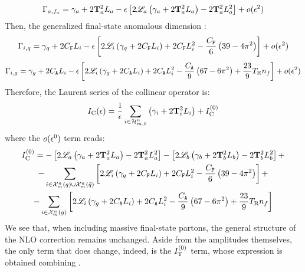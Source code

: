 \begin{equation}
  \Gamma_{a , f_a} = \gamma_a + 2 \mathbf{T}_a^2 L_a - \epsilon \left[ 2 \mathscr{L}_a \left( \gamma_a + 2 \mathbf{T}_a^2 L_a \right) - 2 \mathbf{T}_a^2 L_a^2 \right] + o(\epsilon^2)
\end{equation}
Then, the generalized final-state anomalous dimension :
\begin{equation}
  \Gamma_{i , q} = \gamma_q + 2 C_\mathtt{F} L_i - \epsilon \left[ 2 \mathscr{L}_i \left( \gamma_q + 2 C_\mathtt{F} L_i \right) + 2 C_\mathtt{F} L_i^2 - \frac{C_\mathtt{F}}{6} \left( 39 - 4\pi^2 \right) \right] + o(\epsilon^2)
\end{equation}
\begin{equation}
  \Gamma_{i , g} = \gamma_g + 2 C_\mathtt{A} L_i - \epsilon \left[ 2 \mathscr{L}_i \left( \gamma_g + 2 C_\mathtt{A} L_i \right) + 2 C_\mathtt{A} L_i^2 - \frac{C_\mathtt{A}}{9} \left( 67 - 6\pi^2 \right) + \frac{23}{9} T_\text{R} n_f \right] + o(\epsilon^2)
\end{equation}
Therefore, the Laurent series of the collinear operator is:
\begin{equation}
  I_\text{C}(\epsilon) = \frac{1}{\epsilon} \sum_{i \in \mathcal{H}^{n}_{m,0}} \left( \gamma_i + 2 \mathbf{T}_i^2 L_i \right) + I_\text{C}^{(0)}
\end{equation}
where the $ o(\epsilon^0) $ term reads:
\begin{multline}
  I_\text{C}^{(0)} = - \left[ 2 \mathscr{L}_a \left( \gamma_a + 2 \mathbf{T}_a^2 L_a \right) - 2 \mathbf{T}_a^2 L_a^2 \right] - \left[ 2 \mathscr{L}_b \left( \gamma_b + 2 \mathbf{T}_b^2 L_b \right) - 2 \mathbf{T}_b^2 L_b^2 \right] + \\
  - \sum_{i \in \mathcal{X}^{n}_{m}(q) \cup \mathcal{X}^{n}_{m}(\bar{q})} \left[ 2 \mathscr{L}_i \left( \gamma_q + 2 C_\mathtt{F} L_i \right) + 2 C_\mathtt{F} L_i^2 - \frac{C_\mathtt{F}}{6} \left( 39 - 4\pi^2 \right) \right] + \\
  - \sum_{i \in \mathcal{X}^{n}_{m}(g)} \left[ 2 \mathscr{L}_i \left( \gamma_g + 2 C_\mathtt{A} L_i \right) + 2 C_\mathtt{A} L_i^2 - \frac{C_\mathtt{A}}{9} \left( 67 - 6\pi^2 \right) + \frac{23}{9} T_\text{R} n_f \right]
  \label{eq:ico-zero}
\end{multline}
We see that, when including massive final-state partons, the general structure of the NLO correction  remains unchanged. Aside from the amplitudes themselves, the only term that does change, indeed, is the $ I_\text{T}^{(0)} $ term, whose expression is obtained combining .










